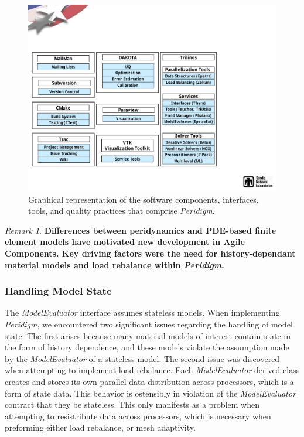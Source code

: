 \documentclass[pdf,ps2pdf,12pt,report]{SANDreport}
\theoremstyle{plain}
\theoremstyle{definition}
\theoremstyle{remark}
\newtheorem{rem}{Remark}[section]
\numberwithin{equation}{section}
\begin{document}
\begin{figure}[h!]
\begin{center}
	\includegraphics[width=\linewidth]{PeridigmComponents}
 \end{center}
 \caption{Graphical representation of the software components, interfaces, tools, and quality practices that comprise \emph{Peridigm}.}
\label{fig:PeridigmComponents}
\end{figure}

\begin{rem}
\textbf{Differences between peridynamics and PDE-based finite element models have motivated new development in Agile Components. Key driving factors were the need for history-dependant material models and load rebalance within \emph{Peridigm}.}
\end{rem}

\subsubsection{Handling Model State}

The \emph{ModelEvaluator} interface assumes stateless models. When implementing \emph{Peridigm}, we encountered two significant issues regarding the handling of model state. The first arises because many material models of interest contain state in the form of history dependence, and these models violate the assumption made by the \emph{ModelEvaluator} of a stateless model. The second issue was discovered when attempting to implement load rebalance. Each \emph{ModelEvaluator}-derived class creates and stores its own parallel data distribution across processors, which is a form of state data. This behavior is ostensibly in violation of the \emph{ModelEvaluator} contract that they be stateless. This only manifests as a problem when attempting to resistribute data across processors, which is necessary when preforming either load rebalance, or mesh adaptivity.
\end{document}
